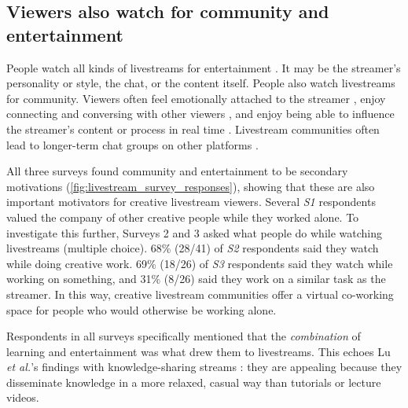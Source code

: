 \subsection{Viewers also watch for community and entertainment}
People watch all kinds of livestreams for entertainment \cite{Wohn2018, Lu2018a, Hilvert-Bruce2018, Faas2018, Cheung2011}. It may be the streamer's personality or style, the chat, or the content itself. %
People also watch livestreams for community. Viewers often feel emotionally attached to the streamer \cite{Wohn2018, Hu2017}, enjoy connecting and conversing with other viewers \cite{Lu2019, Lu2018, Hilvert-Bruce2018}, and enjoy being able to influence the streamer's content or process in real time \cite{Lu2018a}. Livestream communities often lead to longer-term chat groups on other platforms \cite{Lu2018a, Faas2018}.

All three surveys found community and entertainment to be secondary motivations (\autoref{fig:livestream_survey_responses}), showing that these are also important motivators for creative livestream viewers. Several \textit{S1} respondents valued the company of other creative people while they worked alone. To investigate this further, Surveys 2 and 3 asked what people do while watching livestreams (multiple choice). 68\% (28/41) of \textit{S2} respondents said they watch while doing creative work. 69\% (18/26) of \textit{S3} respondents said they watch while working on something, and 31\% (8/26) said they work on a similar task as the streamer. In this way, creative livestream communities offer a virtual co-working space for people who would otherwise be working alone.

Respondents in all surveys specifically mentioned that the \textit{combination} of learning and entertainment was what drew them to livestreams. This echoes Lu \textit{et al.}'s findings with knowledge-sharing streams \cite{Lu2018a}: they are appealing because they disseminate knowledge in a more relaxed, casual way than tutorials or lecture videos.




